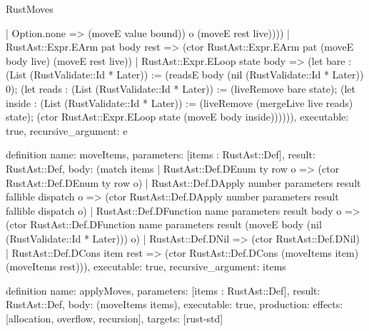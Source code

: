 \begin{lexlean}{RustMoves}
\begin{semanticmodule}
{      | Option.none => (moveE value bound)) o (moveE rest live))))
    | RustAst::Expr.EArm pat body rest => (ctor RustAst::Expr.EArm pat (moveE body live) (moveE rest live))
    | RustAst::Expr.ELoop state body => (let bare : (List (RustValidate::Id * Later)) := (readsE body (nil (RustValidate::Id * Later)) 0); (let reads : (List (RustValidate::Id * Later)) := (liveRemove bare state); (let inside : (List (RustValidate::Id * Later)) := (liveRemove (mergeLive live reads) state); (ctor RustAst::Expr.ELoop state (moveE body inside)))))),
  executable: true,
  recursive_argument: e
}

definition{
  name: moveItems,
  parameters: [items : RustAst::Def],
  result: RustAst::Def,
  body: (match items
    | RustAst::Def.DEnum ty row o => (ctor RustAst::Def.DEnum ty row o)
    | RustAst::Def.DApply number parameters result fallible dispatch o => (ctor RustAst::Def.DApply number parameters result fallible dispatch o)
    | RustAst::Def.DFunction name parameters result body o => (ctor RustAst::Def.DFunction name parameters result (moveE body (nil (RustValidate::Id * Later))) o)
    | RustAst::Def.DNil => (ctor RustAst::Def.DNil)
    | RustAst::Def.DCons item rest => (ctor RustAst::Def.DCons (moveItems item) (moveItems rest))),
  executable: true,
  recursive_argument: items
}

definition{
  name: applyMoves,
  parameters: [items : RustAst::Def],
  result: RustAst::Def,
  body: (moveItems items),
  executable: true,
  production: {effects: [allocation, overflow, recursion], targets: [rust-std]}
}
\end{semanticmodule}
\end{lexlean}
